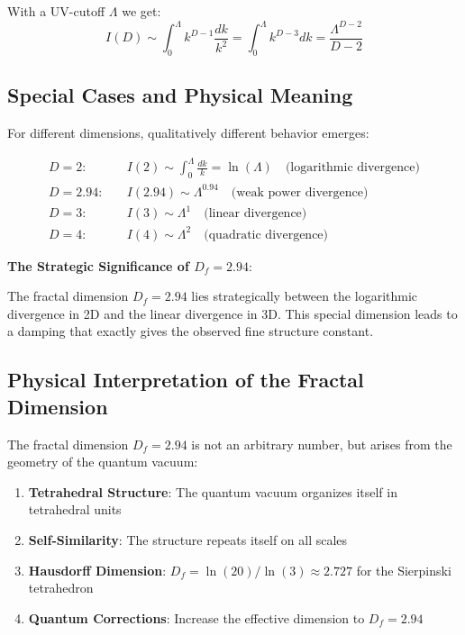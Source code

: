 \documentclass[12pt,a4paper]{article}
\begin{document}
	With a UV-cutoff $\Lambda$ we get:
	\begin{equation}
		I(D) \sim \int_0^{\Lambda} k^{D-1} \frac{dk}{k^2} = \int_0^{\Lambda} k^{D-3} dk = \frac{\Lambda^{D-2}}{D-2}
	\end{equation}
	
	\subsection{Special Cases and Physical Meaning}
	
	For different dimensions, qualitatively different behavior emerges:
	
	\begin{align}
		D = 2: \quad &I(2) \sim \int_0^{\Lambda} \frac{dk}{k} = \ln(\Lambda) \quad \text{(logarithmic divergence)}\\
		D = 2{.}94: \quad &I(2{.}94) \sim \Lambda^{0{.}94} \quad \text{(weak power divergence)}\\
		D = 3: \quad &I(3) \sim \Lambda^{1} \quad \text{(linear divergence)}\\
		D = 4: \quad &I(4) \sim \Lambda^{2} \quad \text{(quadratic divergence)}
	\end{align}
	
	\textbf{The Strategic Significance of $D_f = 2{.}94$}:
	
	The fractal dimension $D_f = 2{.}94$ lies strategically between the logarithmic divergence in 2D and the linear divergence in 3D. This special dimension leads to a damping that exactly gives the observed fine structure constant.
	
	\subsection{Physical Interpretation of the Fractal Dimension}
	
	The fractal dimension $D_f = 2{.}94$ is not an arbitrary number, but arises from the geometry of the quantum vacuum:
	
	\begin{enumerate}
		\item \textbf{Tetrahedral Structure}: The quantum vacuum organizes itself in tetrahedral units
		\item \textbf{Self-Similarity}: The structure repeats itself on all scales
		\item \textbf{Hausdorff Dimension}: $D_f = \ln(20)/\ln(3) \approx 2{.}727$ for the Sierpinski tetrahedron
		\item \textbf{Quantum Corrections}: Increase the effective dimension to $D_f = 2{.}94$
	\end{enumerate}
	
\end{document}
